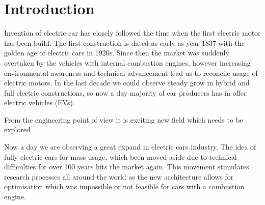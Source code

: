 





\chapter{Introduction}

Invention of electric car has closely followed the time when the first electric motor has been build. The first construction is dated as early as year 1837 with the golden age of electric cars in 1920s. Since then the market was suddenly overtaken by the vehicles with internal combustion engines, however increasing environmental awareness and technical advancement lead us to reconcile usage of electric motors. 
In the last decade we could observe steady grow in hybrid and full electric constructions, so now a day majority of car producers has in offer electric vehicles (EVs).


From the engineering point of view it is exciting new field which needs to be explored 


Now a day we are observing a great expand in electric cars industry. The idea of fully electric cars for mass usage, which been moved aside due to technical difficulties for over 100 years hits the market again. This movement stimulates research processes all around the world as the new architecture allows for optimisation which was impossible or not feasible for cars with a combustion engine.


